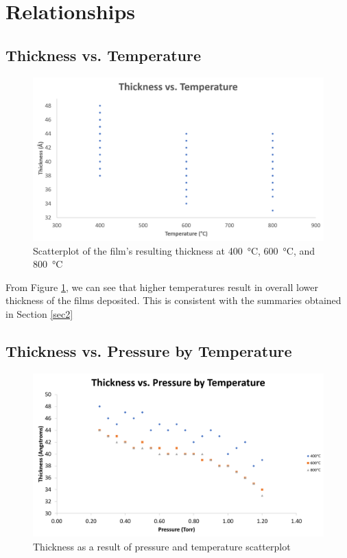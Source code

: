 \documentclass[letterpaper]{article}
\begin{document}
\section{Relationships}

\subsection{Thickness vs. Temperature}

\begin{figure}[H]
 \centering
 \includegraphics[width=\textwidth]{thiccvstemp.png}
 \caption{Scatterplot of the film's resulting thickness at \SI{400}{\celsius}, \SI{600}{\celsius}, and \SI{800}{\celsius}}
 \label{thiccvstemp}
\end{figure}

From Figure \ref{thiccvstemp}, we can see that higher temperatures result in
overall lower thickness of the films deposited. This is consistent with the summaries
obtained in Section \ref{sec2}

\subsection{Thickness vs. Pressure by Temperature}

\begin{figure}[H]
 \centering
 \includegraphics[width=\textwidth]{thiccvspressurebytemp.png}
 \caption{Thickness as a result of pressure and temperature scatterplot}
 \label{thiccvspressurebytemp}
\end{figure}
\end{document}
